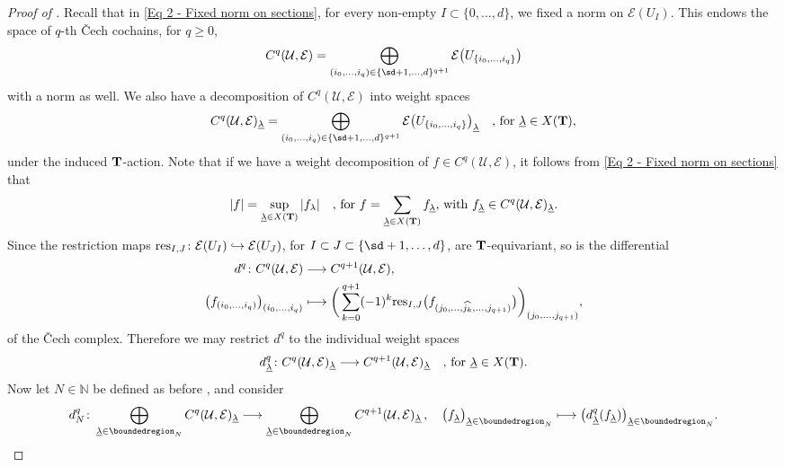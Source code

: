 \documentclass[a4paper, reqno, 10pt]{amsart}
\theoremstyle{definition}
\numberwithin{equation}{section}
\newcommand{\abs}[1]{{\lvert{#1}\rvert}}
\newcommand{\lra}{\longrightarrow}
\newcommand{\lto}{\longmapsto}
\newcommand{\ul}[1]{{\underline{#1}}}
\newcommand{\BN}{{\mathbb {N}}}
\newcommand{\CE}{{\mathcal {E}}}
\newcommand{\CU}{{\mathcal {U}}}
\newcommand{\bT}{{\mathrm{\bf T}}}
\begin{document}
\begin{proof}[{Proof of }]
	Recall that in \eqref{Eq 2 - Fixed norm on sections}, for every non-empty $I \subset \{0,\ldots,d\}$, we fixed a norm on $\CE(U_I)$.
	This endows the space of $q$-th \v{C}ech cochains, for $q\geq 0$, 
	\begin{equation*}
		C^q (\CU,\CE) = \bigoplus_{(i_0,\ldots,i_q) \in \{\sd+1,\ldots,d\}^{q+1}} \CE\big(U_{\{i_0,\ldots,i_q\}}\big)
	\end{equation*}
	with a norm as well.
	We also have a decomposition of $C^q(\CU,\CE)$ into weight spaces
	\begin{equation*}
		C^q(\CU,\CE)_\ul{\lambda} = \bigoplus_{(i_0,\ldots,i_q) \in \{\sd+1,\ldots,d\}^{q+1}} \CE\big(U_{\{i_0,\ldots,i_q\}}\big)_\ul{\lambda} \quad\text{, for $\ul{\lambda} \in X(\bT)$,}
	\end{equation*}
	under the induced $\bT$-action.
	Note that if we have a weight decomposition of $f\in C^q(\CU,\CE)$, it follows from \eqref{Eq 2 - Fixed norm on sections} that
	\begin{equation*}
		\abs{f} = \sup_{\ul{\lambda}\in X(\bT)} \abs{f_{\lambda}} \quad\text{, for $f = \sum_{\ul{\lambda}\in X(\bT)} f_\ul{\lambda}$, with $f_\ul{\lambda} \in C^q(\CU,\CE)_\ul{\lambda}$.}
	\end{equation*}
	Since the restriction maps ${\rm res}_{I,J}\colon \CE(U_I) \hookrightarrow \CE(U_J)$, for $I\subset J \subset \{\sd+1 ,\ldots,d\}$, are $\bT$-equivariant, so is the differential
	\begin{align*}
		d^q \colon C^q(\CU,\CE) &\lra C^{q+1} (\CU,\CE) ,\\
		\big( f_{(i_0,\ldots,i_q)} \big)_{(i_0,\ldots,i_q)} &\lto \bigg( \sum_{k=0}^{q+1} (-1)^k {\rm res}_{I,J}\big(f_{(j_0,\ldots, \widehat{j_k},\ldots,j_{q+1})} \big) \bigg)_{(j_0,\ldots,j_{q+1})} ,
	\end{align*}
	of the \v{C}ech complex.
	Therefore we may restrict $d^q$ to the individual weight spaces
	\begin{equation*}
		d^q_{\ul{\lambda}} \colon C^q(\CU,\CE)_\ul{\lambda} \lra C^{q+1} (\CU,\CE)_\ul{\lambda} \quad\text{, for $\ul{\lambda} \in X(\bT)$.}
	\end{equation*}
	Now let $N\in \BN$ be defined as before , and consider
	\begin{equation*}
		d^q_N \colon \bigoplus_{\ul{\lambda}\in \boundedregion_N} C^q (\CU,\CE)_\ul{\lambda} \lra \bigoplus_{\ul{\lambda}\in \boundedregion_N} C^{q+1} (\CU,\CE)_\ul{\lambda} \,,\quad \big(f_\ul{\lambda}\big)_{\ul{\lambda}\in \boundedregion_N} \lto \big(d^q_\ul{\lambda}(f_\ul{\lambda})\big)_{\ul{\lambda}\in \boundedregion_N}.

\end{equation*}
\end{proof}
\end{document}

